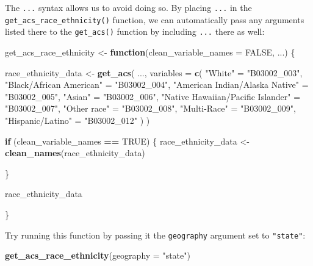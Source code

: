 \documentclass[
]{book}
\newenvironment{Shaded}{\begin{snugshade}}{\end{snugshade}}
\newcommand{\AttributeTok}[1]{\textcolor[rgb]{0.13,0.29,0.53}{#1}}
\newcommand{\ConstantTok}[1]{\textcolor[rgb]{0.56,0.35,0.01}{#1}}
\newcommand{\ControlFlowTok}[1]{\textcolor[rgb]{0.13,0.29,0.53}{\textbf{#1}}}
\newcommand{\FunctionTok}[1]{\textcolor[rgb]{0.13,0.29,0.53}{\textbf{#1}}}
\newcommand{\NormalTok}[1]{#1}
\newcommand{\OtherTok}[1]{\textcolor[rgb]{0.56,0.35,0.01}{#1}}
\newcommand{\SpecialCharTok}[1]{\textcolor[rgb]{0.81,0.36,0.00}{\textbf{#1}}}
\newcommand{\StringTok}[1]{\textcolor[rgb]{0.31,0.60,0.02}{#1}}
\begin{document}
The \texttt{...} syntax allows us to avoid doing so. By placing \texttt{...} in the \texttt{get\_acs\_race\_ethnicity()} function, we can automatically pass any arguments listed there to the \texttt{get\_acs()} function by including \texttt{...} there as well:

\begin{Shaded}
\begin{Highlighting}[]
\NormalTok{get\_acs\_race\_ethnicity }\OtherTok{\textless{}{-}} \ControlFlowTok{function}\NormalTok{(}\AttributeTok{clean\_variable\_names =} \ConstantTok{FALSE}\NormalTok{,}
\NormalTok{                                   ...) \{}
  
\NormalTok{  race\_ethnicity\_data }\OtherTok{\textless{}{-}}
    \FunctionTok{get\_acs}\NormalTok{(}
\NormalTok{      ...,}
      \AttributeTok{variables =} \FunctionTok{c}\NormalTok{(}
        \StringTok{"White"} \OtherTok{=} \StringTok{"B03002\_003"}\NormalTok{,}
        \StringTok{"Black/African American"} \OtherTok{=} \StringTok{"B03002\_004"}\NormalTok{,}
        \StringTok{"American Indian/Alaska Native"} \OtherTok{=} \StringTok{"B03002\_005"}\NormalTok{,}
        \StringTok{"Asian"} \OtherTok{=} \StringTok{"B03002\_006"}\NormalTok{,}
        \StringTok{"Native Hawaiian/Pacific Islander"} \OtherTok{=} \StringTok{"B03002\_007"}\NormalTok{,}
        \StringTok{"Other race"} \OtherTok{=} \StringTok{"B03002\_008"}\NormalTok{,}
        \StringTok{"Multi{-}Race"} \OtherTok{=} \StringTok{"B03002\_009"}\NormalTok{,}
        \StringTok{"Hispanic/Latino"} \OtherTok{=} \StringTok{"B03002\_012"}
\NormalTok{      )}
\NormalTok{    )}
  
  \ControlFlowTok{if}\NormalTok{ (clean\_variable\_names }\SpecialCharTok{==} \ConstantTok{TRUE}\NormalTok{) \{}
\NormalTok{    race\_ethnicity\_data }\OtherTok{\textless{}{-}} \FunctionTok{clean\_names}\NormalTok{(race\_ethnicity\_data)}
    
\NormalTok{  \}}
  
\NormalTok{  race\_ethnicity\_data}
  
\NormalTok{\}}
\end{Highlighting}
\end{Shaded}

Try running this function by passing it the \texttt{geography} argument set to \texttt{"state"}:

\begin{Shaded}
\begin{Highlighting}[]
\FunctionTok{get\_acs\_race\_ethnicity}\NormalTok{(}\AttributeTok{geography =} \StringTok{"state"}\NormalTok{)}
\end{Highlighting}
\end{Shaded}
\end{document}
